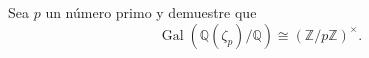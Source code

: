 Sea $p$ un número primo y demuestre que
\[\operatorname{Gal}(\mathbb{Q}(\zeta_{p})/\mathbb{Q})\cong (\mathbb{Z}/p\mathbb{Z})^{\times}.\]
